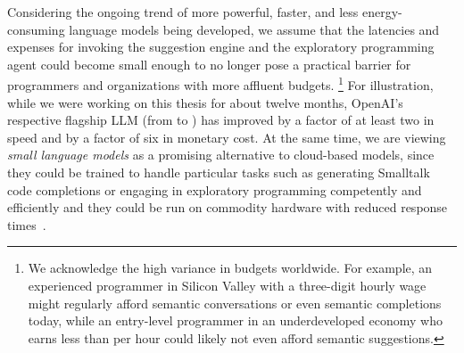 \ParSep

Considering the ongoing trend of more powerful, faster, and less energy-consuming language models being developed, we assume that the latencies and expenses for invoking the suggestion engine and the exploratory programming agent could become small enough to no longer pose a practical barrier for programmers and organizations with more affluent budgets.%
\footnote{We acknowledge the high variance in budgets worldwide. For example, an experienced programmer in Silicon Valley with a three-digit hourly wage might regularly afford semantic conversations or even semantic completions today, while an entry-level programmer in an underdeveloped economy who earns less than  per hour could likely not even afford semantic suggestions.}
For illustration, while we were working on this thesis for about twelve months, OpenAI's respective flagship LLM (from  to ) has improved by a factor of at least two in speed and by a factor of six in monetary cost.
At the same time, we are viewing \emph{small language models} as a promising alternative to cloud-based models, since they could be trained to handle particular tasks such as generating Smalltalk code completions or engaging in exploratory programming competently and efficiently and they could be run on commodity hardware with reduced response times~\cite{magister2023teaching}.
